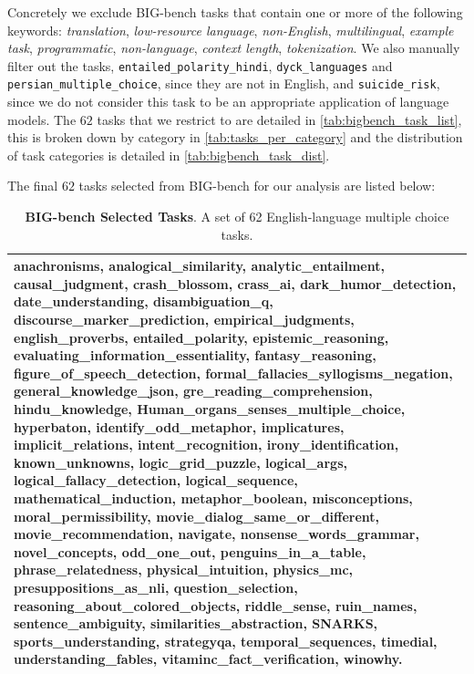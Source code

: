 \documentclass[11pt, a4paper, logo, internal, copyright, nonumbering]{deepmind}
\newcommand{\bigbench}{BIG-bench\xspace}
\begin{document}
Concretely we exclude \bigbench tasks that contain one or more of the following keywords: \textit{translation}, \textit{low-resource language}, \textit{non-English},  \textit{multilingual}, \textit{example task},  \textit{programmatic}, \textit{non-language}, \textit{context length}, \textit{tokenization}. We also manually filter out the tasks, \texttt{entailed\_polarity\_hindi}, \texttt{dyck\_languages} and \texttt{persian\_multiple\_choice}, since they are not in English, and \texttt{suicide\_risk}, since we do not consider this task to be an appropriate application of language models. The $62$ tasks that we restrict to are detailed in \autoref{tab:bigbench_task_list}, this is broken down by category in \autoref{tab:tasks_per_category} and the distribution of task categories is detailed in \autoref{tab:bigbench_task_dist}.

The final $62$ tasks selected from \bigbench for our analysis are listed below: 
\begin{table}
\centering
\begin{tabular}{p{}}
\toprule
anachronisms, analogical\_similarity, analytic\_entailment, causal\_judgment, crash\_blossom, crass\_ai, dark\_humor\_detection, date\_understanding, disambiguation\_q, discourse\_marker\_prediction, empirical\_judgments, english\_proverbs, entailed\_polarity, epistemic\_reasoning, evaluating\_information\_essentiality, fantasy\_reasoning, figure\_of\_speech\_detection, formal\_fallacies\_syllogisms\_negation, general\_knowledge\_json, gre\_reading\_comprehension, hindu\_knowledge, Human\_organs\_senses\_multiple\_choice, hyperbaton, identify\_odd\_metaphor, implicatures, implicit\_relations, intent\_recognition, irony\_identification, known\_unknowns, logic\_grid\_puzzle, logical\_args, logical\_fallacy\_detection, logical\_sequence, mathematical\_induction, metaphor\_boolean, misconceptions, moral\_permissibility, movie\_dialog\_same\_or\_different, movie\_recommendation, navigate, nonsense\_words\_grammar, novel\_concepts, odd\_one\_out, penguins\_in\_a\_table, phrase\_relatedness, physical\_intuition, physics\_mc, presuppositions\_as\_nli, question\_selection, reasoning\_about\_colored\_objects, riddle\_sense, ruin\_names, sentence\_ambiguity, similarities\_abstraction, SNARKS, sports\_understanding, strategyqa, temporal\_sequences, timedial, understanding\_fables, vitaminc\_fact\_verification, winowhy. \\
\bottomrule
\end{tabular}
\caption{\textbf{\bigbench Selected Tasks}. A set of 62 English-language multiple choice tasks.}
\label{tab:bigbench_task_list}
\end{table}
\end{document}
